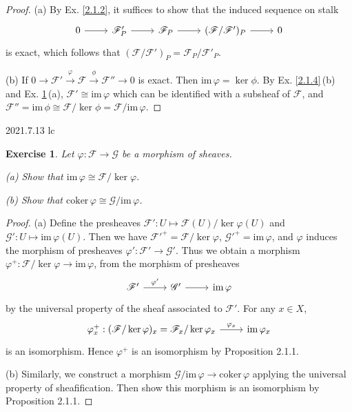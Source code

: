 \documentclass{amsart}
\newtheorem{exe}{Exercise}[subsection]
\begin{document}
\begin{proof}
   (a) By Ex. \ref{2.1.2}, it suffices to show that the induced sequence on stalk
   \begin{equation*}
   	\begin{tikzcd}
   		0 \arrow[r] & \mathscr{F}^{\prime}_P \arrow[r] & \mathscr{F}_P \arrow[r] & (\mathscr{F}/\mathscr{F}^{\prime})_P \arrow[r] & 0
   	\end{tikzcd}
   \end{equation*}
   is exact, which follows that $(\mathscr{F}/\mathscr{F}')_{P}=\mathscr{F}_P/\mathscr{F}'_P$.
   
   (b) If $0 \rightarrow \mathscr{F}' \xrightarrow{\varphi} \mathscr{F} \xrightarrow{\phi} \mathscr{F}'' \rightarrow 0$ is exact. Then $\mathrm{im}\,{\varphi} = \ker{\phi}$. By Ex. \ref{2.1.4}\,(b) and Ex. \ref{2.1.7}\,(a), $\mathscr{F}'\cong\mathrm{im}\,\varphi$ which can be identified with a subsheaf of $\mathscr{F}$, and $\mathscr{F}''=\mathrm{im}\,\phi\cong \mathscr{F}/\ker\phi=\mathscr{F}/\mathrm{im}\,\varphi$.
\end{proof}

2021.7.13 lc
\begin{exe}
	\label{2.1.7}
	Let $\varphi:\mathscr{F}\to\mathscr{G}$ be a morphism of sheaves.
	
	(a) Show that $\mathrm{im}\,\varphi\cong\mathscr{F}/\ker\varphi$.
	
	(b) Show that $\mathrm{coker}\,\varphi\cong\mathscr{G}/\mathrm{im}\,\varphi$.
\end{exe}

\begin{proof}
	(a) Define the presheaves $\mathscr{F}':U\mapsto\mathscr{F}(U)/\ker\varphi(U)$ and $\mathscr{G}':U\mapsto\mathrm{im}\,\varphi(U)$. Then we have $\mathscr{F}'^+=\mathscr{F}/\ker\varphi$, $\mathscr{G}'^+=\mathrm{im}\,\varphi$, and $\varphi$ induces the morphism of presheaves $\varphi':\mathscr{F}'\to\mathscr{G}'$. Thus we obtain a morphism $\varphi^+:\mathscr{F}/\ker\varphi\rightarrow\mathrm{im}\,\varphi$, from the morphism of presheaves 
	\begin{equation*}
		\begin{tikzcd}
			\mathscr{F}^{\prime} \arrow[r, "\varphi^{\prime}"] & \mathscr{G}^{\prime} \arrow[r] & {\mathrm{im}\,\varphi}
		\end{tikzcd}
	\end{equation*}
	by the universal property of the sheaf associated to $\mathscr{F}'$. For any $x\in X$,
	\begin{equation*}
		\begin{tikzcd}
			\varphi^+_x:(\mathscr{F}/\ker\varphi)_x=\mathscr{F}_x/\ker\varphi_x \arrow[r, "\varphi_x"] & {\mathrm{im}\,\varphi_x}
		\end{tikzcd}
	\end{equation*}
	is an isomorphism. Hence $\varphi^+$ is an isomorphism by Proposition 2.1.1.
	
	(b) Similarly, we construct a morphism $\mathscr{G}/\mathrm{im}\,\varphi\to\mathrm{coker}\,\varphi$ applying the universal property of sheafification. Then show this morphism is an isomorphism by Proposition 2.1.1.
\end{proof}
\end{document}
